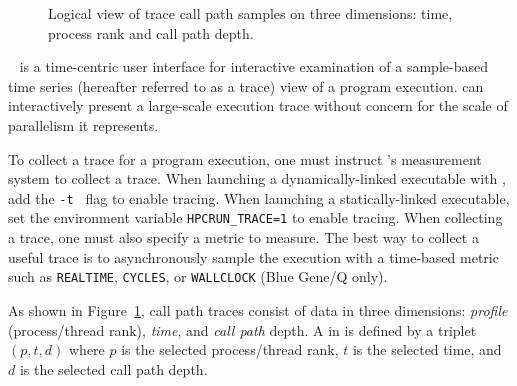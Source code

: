 

\begin{figure}[t]
\caption{Logical view of trace call path samples on three dimensions: time, process rank and call path depth.}
\label{fig:hpctraceviewer-callpath}
\end{figure}

\hpctraceviewer{}~\cite{Tallent-MC-etal:2011:ICS-hpctoolkit-scalable-tracing} is a time-centric user interface for interactive examination of a sample-based time series (hereafter referred to as a trace) view of a program execution.
 \hpctraceviewer{} can interactively present a large-scale execution trace without concern for the scale of parallelism it represents.

To collect a trace for a program execution, one must instruct \HPCToolkit{}'s measurement system to collect a trace. 
When launching a dynamically-linked executable with \hpcrun{}, add the {\tt -t } flag to enable tracing. 
When launching a statically-linked executable, set the environment variable \verb|HPCRUN_TRACE=1| to enable tracing. 
When collecting a trace, one must also specify a metric to measure.  The best way to collect a useful trace is to asynchronously sample the execution with a time-based metric such as {\tt REALTIME}, {\tt CYCLES}, or {\tt WALLCLOCK} (Blue Gene/Q only).

As shown in Figure~\ref{fig:hpctraceviewer-callpath},  call path traces consist of data in three dimensions: \emph{profile} (process/thread rank), \emph{time}, and \emph{call path} depth.
A \emph{\crosshair} in \hpctraceviewer{} is defined by a triplet $(p,t,d)$ where $p$ is the selected process/thread rank, $t$ is the selected time, and $d$ is the selected call path depth. 

